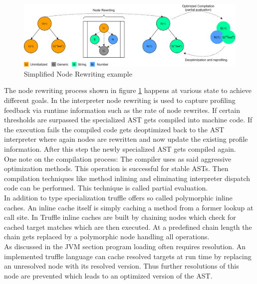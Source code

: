 \begin{figure}
	\includegraphics[scale=0.165]{../figures/NodeJIT.png}
	\caption{Simplified Node Rewriting example \cite{VMRule}}
	\label{fig:trufNR}
\end{figure}
The node rewriting process shown in figure \ref{fig:trufNR} happens at various state to achieve different goals. In the interpreter node rewriting is used to capture profiling feedback via runtime information such as the rate of node rewrites. If certain thresholds are surpassed the specialized AST gets compiled into machine code. If the execution fails the compiled code gets deoptimized back to the AST interpreter where again nodes are rewritten and now update the existing profile information. After this step the newly specialized AST gets compiled again.\\
One note on the compilation process: The compiler uses as said aggressive optimization methods. This operation is successful for stable ASTs. Then compilation techniques like method inlining and eliminating interpreter dispatch code can be performed. This technique is called partial evaluation.\\
In addition to type specialization truffle offers so called polymorphic inline caches. \cite{ChambOpti} An inline cache itself is simply caching a method from a former lookup at call site. In Truffle inline caches are built by chaining nodes which check for cached target matches which are then executed. At a predefined chain length the chain gets replaced by a polymorphic node handling all operations.\\
As discussed in the JVM section program loading often requires resolution. An implemented truffle language can cache resolved targets at run time by replacing an unresolved node with its resolved version. Thus further resolutions of this node are prevented which leads to an optimized version of the AST.\\
